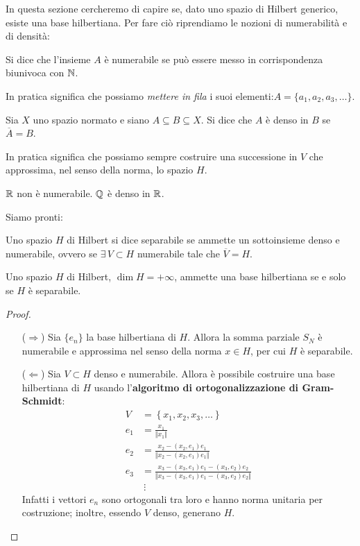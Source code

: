 In questa sezione cercheremo di capire se, dato uno spazio di Hilbert generico, esiste una base hilbertiana. Per fare ciò riprendiamo le nozioni di numerabilità e di densità:

\begin{defn}
Si dice che l'insieme $A$ è numerabile se può essere messo in corrispondenza biunivoca con $\mathbb{N}$.
\end{defn}
In pratica significa che possiamo \textit{mettere in fila} i suoi elementi:$A=\{a_1,a_2,a_3,\dots\}$.
\begin{defn}
Sia $X$ uno spazio normato e siano $A\subseteq B\subseteq X$. Si dice che $A$ è denso in $B$ se $\overline{A}=B$.
\end{defn}
In pratica significa che possiamo sempre costruire una successione in $V$ che approssima, nel senso della norma, lo spazio $H$.
\begin{exa}
$\mathbb{R}$ non è numerabile. $\mathbb{Q}$ è denso in $\mathbb{R}$.
\end{exa}

Siamo pronti:

\begin{defn}
Uno spazio $H$ di Hilbert si dice separabile se ammette un sottoinsieme denso e numerabile, ovvero se $\exists\,V\subset H$ numerabile tale che $\overline{V}=H$.
\end{defn}

\begin{thm}
Uno spazio $H$ di Hilbert, $\dim H=+\infty$, ammette una base hilbertiana se e solo se $H$ è separabile.
\end{thm}

\begin{proof}\leavevmode
\begin{enumerate}
    \item [($\Rightarrow$)] Sia $\{e_n\}$ la base hilbertiana di $H$. Allora la somma parziale $S_N$ è numerabile e approssima nel senso della norma $x\in H$, per cui $H$ è separabile.
    \item [($\Leftarrow$)] Sia $V\subset H$ denso e numerabile. Allora è possibile costruire una base hilbertiana di $H$ usando l'\textbf{algoritmo di ortogonalizzazione di Gram-Schmidt}:
    \begin{align*}
    V&=\left\{x_1,x_2,x_3,\dots \right\} \\
    e_1&=\frac{x_1}{\Vert x_1 \Vert} \\
    e_2&=\frac{x_2-(x_2,e_1)e_1}{\Vert x_2-(x_2,e_1)e_1 \Vert} \\
    e_3&=\frac{x_3-(x_3,e_1)e_1-(x_3,e_2)e_2}{\Vert x_3-(x_3,e_1)e_1-(x_3,e_2)e_2 \Vert} \\
    &\ \vdots
    \end{align*}
    Infatti i vettori $e_n$ sono ortogonali tra loro e hanno norma unitaria per costruzione; inoltre, essendo $V$ denso, generano $H$.
\end{enumerate}
\end{proof}

